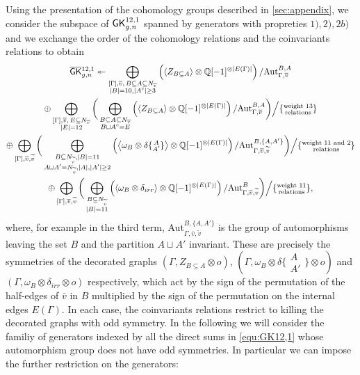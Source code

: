 Using the presentation of the cohomology groups described in \ref{sec:appendix}, we consider the subspace of  $\mathsf{GK}_{g,n}^{12,1}$  spanned by generators with propreties $1),2),2b)$ and we exchange the order of the cohomology relations and the coinvariants relations to obtain 
\begin{multline}\label{equ:GK12,1}
    \overline{\mathsf{GK}}{}_{g,n}^{12,1}  \twoheadleftarrow  \bigoplus_{\substack{[\Gamma],\overline{v},\,B\subseteq A\subseteq N_{\overline{v}} \\ |B|=10, |A^c|\geq 3}} \left( \left<Z_{B\subseteq A}\right> \otimes \mathbb{Q}[-1]^{\otimes |E(\Gamma)|} \right)/\text{Aut}_{\Gamma,\overline{v}}^{B,A} \\
    \oplus \bigoplus_{\substack{[\Gamma],\overline{v},\,E\subseteq N_{\overline{v}} \\ |E|=12}} \bigg( \bigoplus_{\substack{B\subseteq A\subseteq N_{\overline{v}} \\  B\sqcup A^c=E}} \left( \left<Z_{B\subseteq A}\right> \otimes \mathbb{Q}[-1]^{\otimes |E(\Gamma)|} \right)/\text{Aut}_{\Gamma,\overline{v}}^{B,A} \bigg) \Big/ \{\substack{\text{weight 13}\\\text{relations}}\} \\
    \oplus \bigoplus_{[\Gamma],\overline{v},\widetilde{v}} \bigg( \bigoplus_{\substack{B\subseteq N_{\widetilde{v}},|B|=11\\ A\sqcup A'=N_{\widetilde{v}},|A|,|A'|\geq 2}} \left( \left<\omega_B\otimes\delta\{\substack{A \\ A'}\}\right> \otimes \mathbb{Q}[-1]^{\otimes |E(\Gamma)|}\right) / \text{Aut}_{\Gamma,\overline{v},\widetilde{v}}^{B,\{A,A'\} } \bigg) \Big/ \{\substack{\text{weight 11 and 2}\\\text{relations}}\} \\
    \oplus \bigoplus_{[\Gamma],\overline{v},\widetilde{v}} \bigg( \bigoplus_{\substack{B\subseteq N_{\widetilde{v}}\\ |B|=11}} \left( \left<\omega_B\otimes \delta_{irr}\right> \otimes \mathbb{Q}[-1]^{\otimes |E(\Gamma)|}\right) / \text{Aut}_{\Gamma,\overline{v},\widetilde{v}}^B \bigg) \Big/ \{\substack{\text{weight 11}\\\text{relations}}\} ,
\end{multline}
where, for example in the third term, Aut$_{\Gamma,\bar{v},\tilde{v}}^{B,\{A,A'\}}$ is the group of automorphisms leaving the set $B$ and the partition $A\sqcup A'$ invariant.
These are precisely the symmetries of the decorated graphs $(\Gamma,Z_{B\subseteq A}\otimes o)$, $(\Gamma,\omega_B\otimes\delta\{\substack{A \\ A'}\}\otimes o)$ and $(\Gamma,\omega_B\otimes \delta_{irr}\otimes o)$ respectively, which act by the sign of the permutation of the half-edges of $\bar{v}$ in $B$ multiplied by the sign of the permutation on the internal edges $E(\Gamma)$. In each case, the coinvariants relations restrict to killing the decorated graphs with odd symmetry. In the following we will consider the familiy of generators indexed by all the direct sums in \ref{equ:GK12,1} whose automorphism group does not have odd symmetries. In particular we can impose the further restriction on the generators:
